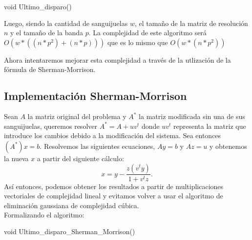 \begin{algorithm}
\begin{algorithmic}[1]\parskip=1mm
\caption{void Ultimo\_disparo()}
\end{algorithmic}
\end{algorithm}

Luego, siendo la cantidad de sanguijuelas $w$, el tamaño de la matriz de resolución $n$ y el tamaño de la banda $p$. La complejidad de este algoritmo será $O(w*((n*p^2) + (n*p)) )$ que es lo mismo que $O(w*(n*p^2))$

Ahora intentaremos mejorar esta complejidad a través de la utlización de la fórmula de Sherman-Morrison.

\subsection{Implementación Sherman-Morrison}

Sean $A$ la matriz original del problema y $A^*$ la matriz modificada sin una de sus sanguijuelas, queremos resolver $A^* = A + uv^t$ donde $uv^t$ representa la matriz que introduce los cambios debido a la modificación del sistema. Sea entonces
$(A^*)x = b$. Resolvemos las siguientes ecuaciones, $Ay = b$ y $Az = u$ y obtenemos la nueva $x$ a partir del siguiente cálculo:
\begin{equation}
x = y - \frac{z(v^ty)}{1+v^tz}.
\end{equation}
Así entonces, podemos obtener los resultados a partir de multiplicaciones vectoriales de complejidad lineal y evitamos volver a usar el algoritmo de eliminación gaussiana de complejidad cúbica.
\\

Formalizando el algoritmo:
\begin{algorithm}
\begin{algorithmic}[1]\parskip=1mm
\caption{void Ultimo\_disparo\_Sherman\_Morrison()}
\end{algorithmic}
\end{algorithm}

